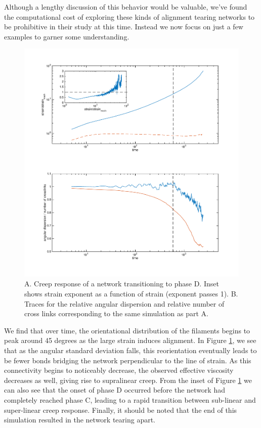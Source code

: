 \documentclass[pre,preprint]{revtex4-1}
\begin{document}
Although a lengthy discussion of this behavior would be valuable, we've found the computational cost of exploring these kinds of alignment tearing networks to be prohibitive in their study at this time.  Instead we now focus on just a few examples to garner some understanding.

\begin{figure}[h!]
\centering
\includegraphics[width=\hsize]{tearer}
\caption{\label{fig:tearer} A. Creep response of a network transitioning to phase D. Inset shows strain exponent as a function of strain (exponent passes 1).  B.  Traces for the relative angular dispersion and relative number of cross links corresponding to the same simulation as part A. }
\end{figure}

We find that over time, the orientational distribution of the filaments begins to peak around 45 degrees as the large strain induces alignment.  In Figure \ref{fig:tearer}, we see that as the angular standard deviation falls, this reorientation eventually leads to be fewer bonds bridging the network perpendicular to the line of strain.  As this connectivity begins to noticeably decrease, the observed effective viscosity decreases as well, giving rise to supralinear creep.  From the inset of Figure \ref{fig:tearer} we can also see that the onset of phase D occurred before the network had completely reached phase C, leading to a rapid transition between sub-linear and super-linear creep response.  Finally, it should be noted that the end of this simulation resulted in the network tearing apart.  
\end{document}
